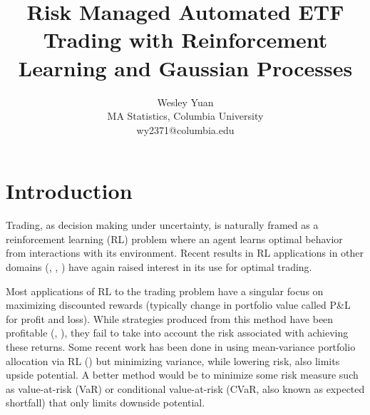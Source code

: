 \documentclass[12pt]{article}
\begin{document}
\title{\bf{Risk Managed Automated ETF Trading with Reinforcement Learning and Gaussian Processes}}
\author{Wesley Yuan \\ MA Statistics, Columbia University \\ wy2371@columbia.edu}

\maketitle


\section{Introduction} \label{intro}

Trading, as decision making under uncertainty, is naturally framed as a reinforcement learning (RL) problem where an agent learns optimal behavior from interactions with its environment. Recent results in RL applications in other domains (\cite{Silver2017}, \cite{GoogleAtari}, \cite{AlphaGo}) have again raised interest in its use for optimal trading. 

Most applications of RL to the trading problem have a singular focus on maximizing discounted rewards (typically change in portfolio value called P\&L for profit and loss). While strategies produced from this method have been profitable (\cite{Deng2017}, \cite{Yang2020}), they fail to take into account the risk associated with achieving these returns. Some recent work has been done in using mean-variance portfolio allocation via RL (\cite{Wang2019}) but minimizing variance, while lowering risk, also limits upside potential. A better method would be to minimize some risk measure such as value-at-risk (VaR) or conditional value-at-risk (CVaR, also known as expected shortfall) that only limits downside potential. 
\end{document}
